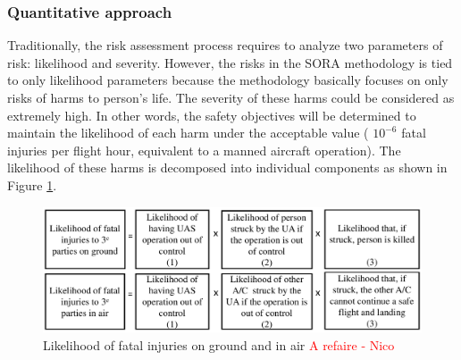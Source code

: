 \documentclass[a4paper, 10, conference]{ieeeconf}  %
\begin{document}
\subsubsection{Quantitative approach}
Traditionally, the risk assessment process requires to analyze two parameters of risk: likelihood and severity. However, the risks in the SORA methodology is tied to only likelihood parameters \cite{SORAV1} because the methodology basically focuses on only risks of harms to person's life. The severity of these harms could be considered as extremely high. In other words, the safety objectives will be determined to maintain the likelihood of each harm under the acceptable value ( $10^{-6}$ fatal injuries per flight hour, equivalent to a manned aircraft operation\cite{SORAV1}). The likelihood of these harms is decomposed into individual components as shown in Figure \ref{figure: likelihood estimation}. 

 \begin{figure}[!ht]
 	\centering
 	\includegraphics[width=3.4 in]{image/likelihood_estimation.pdf}
 	\caption{Likelihood of fatal injuries on ground and in air \cite{SORAV1} \textcolor{red}{A refaire - Nico}}
 	\label{figure: likelihood estimation}
 \end{figure}  
 
\end{document}
